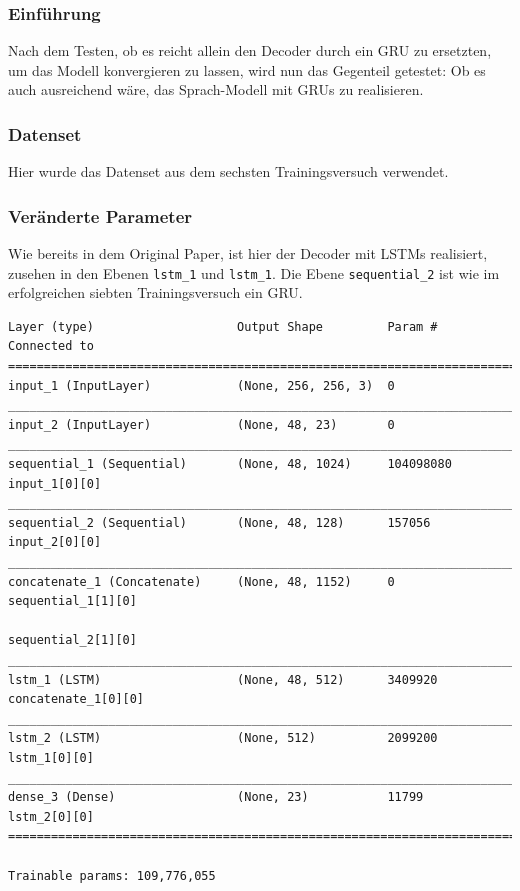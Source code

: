 \documentclass[pdftex,a4paper,halfparskip, article]{scrartcl}
\begin{document}
\subsubsection*{Einführung}

Nach dem Testen, ob es reicht allein den Decoder durch ein GRU zu ersetzten, um das Modell konvergieren zu lassen, wird nun das Gegenteil getestet: Ob es auch ausreichend wäre, das Sprach-Modell mit GRUs zu realisieren.

\subsubsection*{Datenset}

Hier wurde das Datenset aus dem sechsten Trainingsversuch verwendet.

\subsubsection*{Veränderte Parameter}

Wie bereits in dem Original Paper, ist hier der Decoder mit LSTMs realisiert, zusehen in den Ebenen \texttt{lstm\_1} und \texttt{lstm\_1}. Die Ebene \texttt{sequential\_2} ist wie im erfolgreichen siebten Trainingsversuch ein GRU.

\begin{verbatim}
Layer (type)                    Output Shape         Param #     Connected to
===============================================================================
input_1 (InputLayer)            (None, 256, 256, 3)  0
_______________________________________________________________________________
input_2 (InputLayer)            (None, 48, 23)       0
_______________________________________________________________________________
sequential_1 (Sequential)       (None, 48, 1024)     104098080   input_1[0][0]
_______________________________________________________________________________
sequential_2 (Sequential)       (None, 48, 128)      157056      input_2[0][0]
_______________________________________________________________________________
concatenate_1 (Concatenate)     (None, 48, 1152)     0           sequential_1[1][0]
                                                                 sequential_2[1][0]
_______________________________________________________________________________
lstm_1 (LSTM)                   (None, 48, 512)      3409920     concatenate_1[0][0]
_______________________________________________________________________________
lstm_2 (LSTM)                   (None, 512)          2099200     lstm_1[0][0]
_______________________________________________________________________________
dense_3 (Dense)                 (None, 23)           11799       lstm_2[0][0]
===============================================================================

Trainable params: 109,776,055

\end{verbatim}
\end{document}
